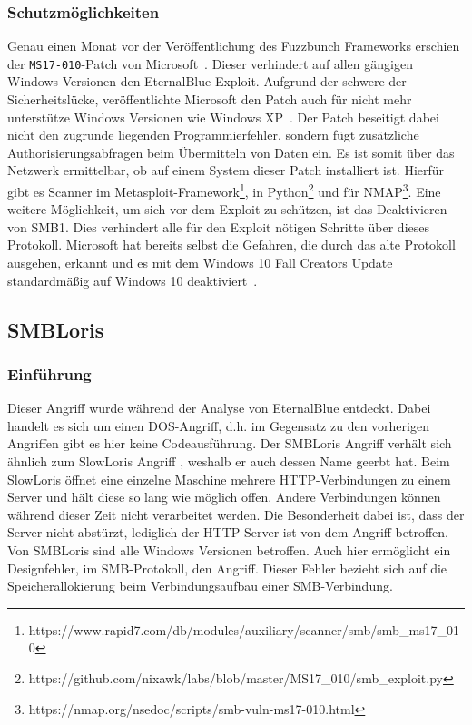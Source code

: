 \documentclass{AIFB_ITI_Crypto_Seminar}
\begin{document}
\subsubsection{Schutzmöglichkeiten}
Genau einen Monat vor der Veröffentlichung des Fuzzbunch Frameworks erschien der \texttt{MS17-010}-Patch von Microsoft~\cite{patch}. Dieser verhindert auf allen gängigen Windows Versionen den EternalBlue-Exploit. Aufgrund der schwere der Sicherheitslücke, veröffentlichte Microsoft den Patch auch für nicht mehr unterstütze Windows Versionen wie Windows XP~\cite{xp}. Der Patch beseitigt dabei nicht den zugrunde liegenden Programmierfehler, sondern fügt zusätzliche Authorisierungsabfragen beim Übermitteln von Daten ein. Es ist somit über das Netzwerk ermittelbar, ob auf einem System dieser Patch installiert ist. Hierfür gibt es Scanner im Metasploit-Framework\footnote{https://www.rapid7.com/db/modules/auxiliary/scanner/smb/smb\_ms17\_010}, in Python\footnote{https://github.com/nixawk/labs/blob/master/MS17\_010/smb\_exploit.py} und für NMAP\footnote{https://nmap.org/nsedoc/scripts/smb-vuln-ms17-010.html}. Eine weitere Möglichkeit, um sich vor dem Exploit zu schützen, ist das Deaktivieren von SMB1. Dies verhindert alle für den Exploit nötigen Schritte über dieses Protokoll. Microsoft hat bereits selbst die Gefahren, die durch das alte Protokoll ausgehen, erkannt und es mit dem Windows 10 Fall Creators Update standardmäßig auf Windows 10 deaktiviert~\cite{fall_creator}.

\subsection{SMBLoris}
\label{sub:loris}
\subsubsection{Einführung}
Dieser Angriff wurde während der Analyse von EternalBlue entdeckt. Dabei handelt es sich um einen DOS-Angriff, d.h. im Gegensatz zu den vorherigen Angriffen gibt es hier keine Codeausführung. Der SMBLoris Angriff verhält sich ähnlich zum SlowLoris Angriff \cite{banks}, weshalb er auch dessen Name geerbt hat. Beim SlowLoris öffnet eine einzelne Maschine mehrere HTTP-Verbindungen zu einem Server und hält diese so lang wie möglich offen. Andere Verbindungen können während dieser Zeit nicht verarbeitet werden. Die Besonderheit dabei ist, dass der Server nicht abstürzt, lediglich der HTTP-Server ist von dem Angriff betroffen. Von SMBLoris sind alle Windows Versionen betroffen. Auch hier ermöglicht ein Designfehler, im SMB-Protokoll, den Angriff. Dieser Fehler bezieht sich auf die Speicherallokierung beim Verbindungsaufbau einer SMB-Verbindung.
\end{document}

